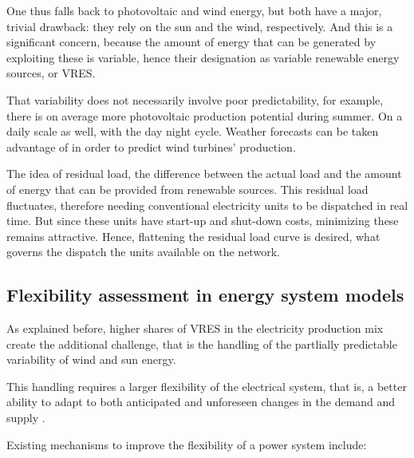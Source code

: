 One thus falls back to photovoltaic and wind energy, but both have a major, trivial drawback: they rely on the sun and the wind, respectively. And this is a significant concern, because the amount of energy that can be generated by exploiting these is variable, hence their designation as variable renewable energy sources, or VRES.

That variability does not necessarily involve poor predictability, for example, there is on average more photovoltaic production potential during summer. On a daily scale as well, with the day night cycle. Weather forecasts can be taken advantage of in order to predict wind turbines' production.

The idea of residual load, the difference between the actual load and the amount of energy that can be provided from renewable sources. This residual load fluctuates, therefore needing conventional electricity units to be dispatched in real time. But since these units have start-up and shut-down costs, minimizing these remains attractive. Hence, flattening the residual load curve is desired, what governs the dispatch the units available on the network.

\subsection{Flexibility assessment in energy system models}

As explained before, higher shares of VRES in the electricity production mix create the additional challenge, that is the handling of the partlially predictable variability of wind and sun energy. 

This handling requires a larger flexibility of the electrical system, that is, a better ability to adapt to both anticipated and unforeseen changes in the demand and supply \cite{irena}.

Existing mechanisms to improve the flexibility of a power system include:

